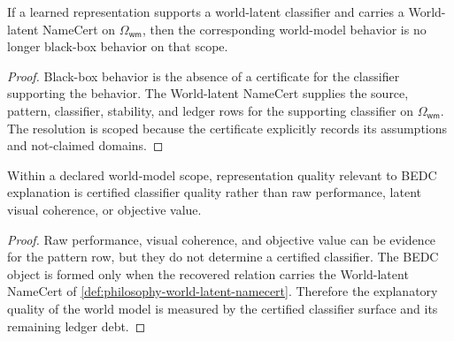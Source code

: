 \begin{theorem}
\label{thm:philosophy-world-model-certification-scoped-black-box-resolution}
If a learned representation supports a world-latent classifier and
carries a World-latent NameCert on $\Omega_{\mathsf{wm}}$, then the
corresponding world-model behavior is no longer black-box behavior on
that scope.
\end{theorem}
\begin{proof}
Black-box behavior is the absence of a certificate for the classifier
supporting the behavior. The World-latent NameCert supplies the source,
pattern, classifier, stability, and ledger rows for the supporting
classifier on $\Omega_{\mathsf{wm}}$. The resolution is scoped because
the certificate explicitly records its assumptions and not-claimed
domains.
\end{proof}

\begin{theorem}
\label{thm:philosophy-world-model-quality-certified-classifier-quality}
Within a declared world-model scope, representation quality relevant to
BEDC explanation is certified classifier quality rather than raw
performance, latent visual coherence, or objective value.
\end{theorem}
\begin{proof}
Raw performance, visual coherence, and objective value can be evidence
for the pattern row, but they do not determine a certified classifier.
The BEDC object is formed only when the recovered relation carries the
World-latent NameCert of
\autoref{def:philosophy-world-latent-namecert}. Therefore the explanatory
quality of the world model is measured by the certified classifier
surface and its remaining ledger debt.
\end{proof}
